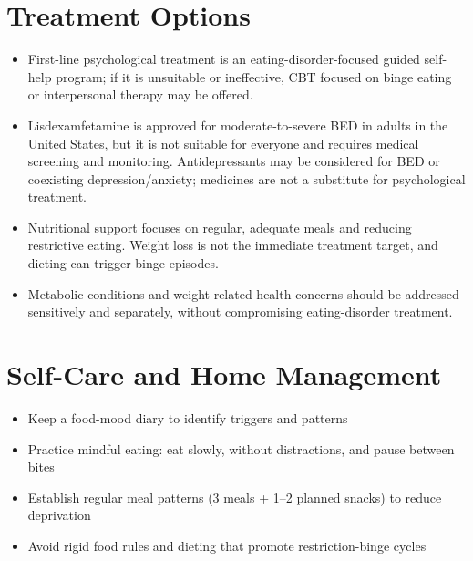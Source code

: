 \section*{Treatment Options}
\begin{itemize}
 \item First-line psychological treatment is an eating-disorder-focused guided self-help program; if it is unsuitable or ineffective, CBT focused on binge eating or interpersonal therapy may be offered.
 \item Lisdexamfetamine is approved for moderate-to-severe BED in adults in the United States, but it is not suitable for everyone and requires medical screening and monitoring. Antidepressants may be considered for BED or coexisting depression/anxiety; medicines are not a substitute for psychological treatment.
 \item Nutritional support focuses on regular, adequate meals and reducing restrictive eating. Weight loss is not the immediate treatment target, and dieting can trigger binge episodes.
 \item Metabolic conditions and weight-related health concerns should be addressed sensitively and separately, without compromising eating-disorder treatment.
\end{itemize}

\section*{Self-Care and Home Management}
\begin{itemize}
 \item Keep a food-mood diary to identify triggers and patterns
 \item Practice mindful eating: eat slowly, without distractions, and pause between bites
 \item Establish regular meal patterns (3 meals + 1--2 planned snacks) to reduce deprivation
 \item Avoid rigid food rules and dieting that promote restriction-binge cycles
\end{itemize}

